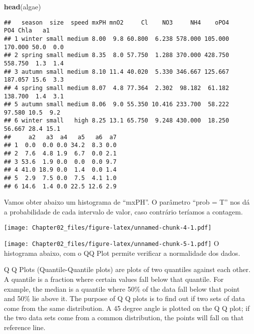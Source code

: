 \documentclass[
]{article}
\newenvironment{Shaded}{\begin{snugshade}}{\end{snugshade}}
\newcommand{\DataTypeTok}[1]{\textcolor[rgb]{0.13,0.29,0.53}{#1}}
\newcommand{\KeywordTok}[1]{\textcolor[rgb]{0.13,0.29,0.53}{\textbf{#1}}}
\newcommand{\NormalTok}[1]{#1}
\newcommand{\OperatorTok}[1]{\textcolor[rgb]{0.81,0.36,0.00}{\textbf{#1}}}
\begin{document}
\begin{Shaded}
\begin{Highlighting}[]
\KeywordTok{head}\NormalTok{(algae)}
\end{Highlighting}
\end{Shaded}

\begin{verbatim}
##   season  size  speed mxPH mnO2     Cl    NO3     NH4    oPO4     PO4 Chla   a1
## 1 winter small medium 8.00  9.8 60.800  6.238 578.000 105.000 170.000 50.0  0.0
## 2 spring small medium 8.35  8.0 57.750  1.288 370.000 428.750 558.750  1.3  1.4
## 3 autumn small medium 8.10 11.4 40.020  5.330 346.667 125.667 187.057 15.6  3.3
## 4 spring small medium 8.07  4.8 77.364  2.302  98.182  61.182 138.700  1.4  3.1
## 5 autumn small medium 8.06  9.0 55.350 10.416 233.700  58.222  97.580 10.5  9.2
## 6 winter small   high 8.25 13.1 65.750  9.248 430.000  18.250  56.667 28.4 15.1
##     a2   a3  a4   a5   a6  a7
## 1  0.0  0.0 0.0 34.2  8.3 0.0
## 2  7.6  4.8 1.9  6.7  0.0 2.1
## 3 53.6  1.9 0.0  0.0  0.0 9.7
## 4 41.0 18.9 0.0  1.4  0.0 1.4
## 5  2.9  7.5 0.0  7.5  4.1 1.0
## 6 14.6  1.4 0.0 22.5 12.6 2.9
\end{verbatim}

Vamos obter abaixo um histograma de ``mxPH''. O parâmetro ``prob = T''
nos dá a probabilidade de cada intervalo de valor, caso contrário
teríamos a contagem.

\begin{Shaded}
\end{Shaded}

\texttt{[image: Chapter02\_files/figure-latex/unnamed-chunk-4-1.pdf]}

\begin{Shaded}
\end{Shaded}

\texttt{[image: Chapter02\_files/figure-latex/unnamed-chunk-5-1.pdf]} O
histograma abaixo, com o QQ Plot permite verificar a normalidade dos
dados.

Q Q Plots (Quantile-Quantile plots) are plots of two quantiles against
each other. A quantile is a fraction where certain values fall below
that quantile. For example, the median is a quantile where 50\% of the
data fall below that point and 50\% lie above it. The purpose of Q Q
plots is to find out if two sets of data come from the same
distribution. A 45 degree angle is plotted on the Q Q plot; if the two
data sets come from a common distribution, the points will fall on that
reference line.
\end{document}
